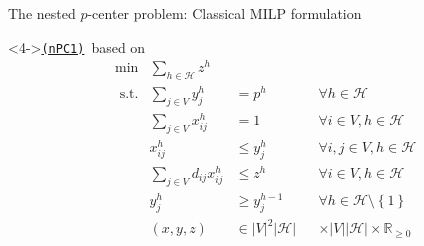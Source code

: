 \documentclass[utf8,aspectratio=169,ngerman,english]{beamer}
\newcommand{\nPC}{\hyperref[eq:nPC]{\texttt{(nPC1)}}\xspace}
\newcommand{\inH}{h \in \mathcal H}
\begin{document}
\begin{frame}{The nested $p$-center problem: Classical MILP formulation}
\begin{minipage}[t]{0.48\textwidth}
\begin{block}
        \end{block}
    \end{minipage}
    \begin{minipage}[t]{0.48\textwidth}
        \begin{block}<4->{\nPC\ based on \cite{wiley2013}}
            \vspace*{-12pt}
            \begin{subequations}
                \begin{alignat}{3}
                     & \min         & \sum_{\inH}z^{h}             &                                                                              \\
                     & \text{ s.t.} & \sum_{j \in V}y_{j}^h        & =     p^{h}           &  & \forall \inH                                      \\
                     &              & \sum_{j \in V}x_{ij}^h       & =     1               &  & \forall i \in V, \inH                             \\
                     &              & x_{ij}^h                     & \leq  y_j^{h}         &  & \forall i,j \in V, \inH                           \\
                     &              & \sum_{j \in V}d_{ij}x_{ij}^h & \leq  z^{h}           &  & \forall i \in V, \inH                             \\
                     &              & y_{j}^h                      & \geq  y_j^{h-1}       &  & \forall \inH \setminus \left \{1 \right \}        \\
                     &              & (x,y,z)                      & \in |V|^2|\mathcal H| &  & \times |V||\mathcal H| \times \mathbb{R}_{\geq 0}
                \end{alignat}  \label{eq:nPC}
            \end{subequations}
        \end{block}
    \end{minipage}
\end{frame}
\end{document}
